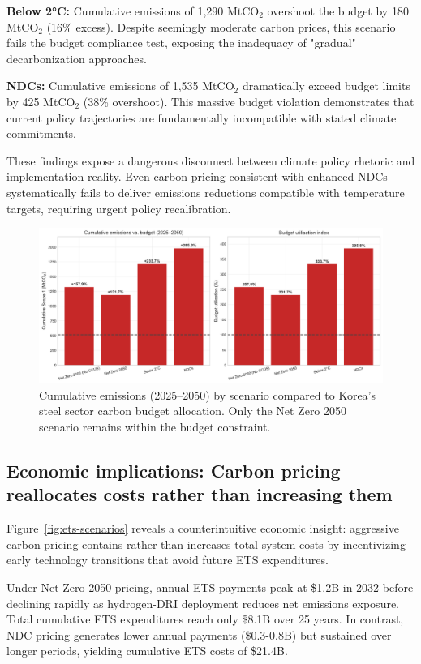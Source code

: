 \documentclass[preprint,1p,authoryear]{elsarticle}
\begin{document}
\textbf{Below 2°C:} Cumulative emissions of 1,290 MtCO$_2$ overshoot the budget by 180 MtCO$_2$ (16\% excess). Despite seemingly moderate carbon prices, this scenario fails the budget compliance test, exposing the inadequacy of "gradual" decarbonization approaches.

\textbf{NDCs:} Cumulative emissions of 1,535 MtCO$_2$ dramatically exceed budget limits by 425 MtCO$_2$ (38\% overshoot). This massive budget violation demonstrates that current policy trajectories are fundamentally incompatible with stated climate commitments.

These findings expose a dangerous disconnect between climate policy rhetoric and implementation reality. Even carbon pricing consistent with enhanced NDCs systematically fails to deliver emissions reductions compatible with temperature targets, requiring urgent policy recalibration.

\begin{figure}[!t]
  \centering
  \includegraphics[width=0.85\linewidth]{carbon_budget_compliance}
  \caption{Cumulative emissions (2025--2050) by scenario compared to Korea's steel sector carbon budget allocation. Only the Net Zero 2050 scenario remains within the budget constraint.}
  \label{fig:carbon-budget}
\end{figure}

\subsection{Economic implications: Carbon pricing reallocates costs rather than increasing them}

Figure~\ref{fig:ets-scenarios} reveals a counterintuitive economic insight: aggressive carbon pricing contains rather than increases total system costs by incentivizing early technology transitions that avoid future ETS expenditures.

Under Net Zero 2050 pricing, annual ETS payments peak at \$1.2B in 2032 before declining rapidly as hydrogen-DRI deployment reduces net emissions exposure. Total cumulative ETS expenditures reach only \$8.1B over 25 years. In contrast, NDC pricing generates lower annual payments (\$0.3-0.8B) but sustained over longer periods, yielding cumulative ETS costs of \$21.4B.
\end{document}
